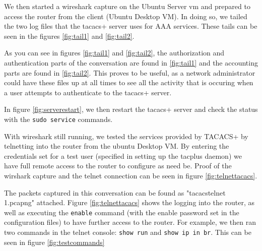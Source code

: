 \documentclass[main.tex]{subfiles}
\begin{document}

We then started a wireshark capture on the Ubuntu Server vm and prepared to access the router from the client (Ubuntu Desktop VM). In doing so, we tailed the two log files that the tacacs+ server uses for AAA services. These tails can be seen in the figures \ref{fig:tail1} and \ref{fig:tail2}.


As you can see in figures \ref{fig:tail1} and \ref{fig:tail2}, the authorization and authentication parts of the conversation are found in \ref{fig:tail1} and the accounting parts are found in \ref{fig:tail2}. This proves to be useful, as a network administrator could have these files up at all times to see all the activity that is occuring when a user attempts to authenticate to the tacacs+ server. 



In figure \ref{fig:serverestart}, we then restart the tacacs+ server and check the status with the \texttt{sudo service} commands.


With wireshark still running, we tested the services provided by TACACS+ by telnetting into the router from the ubuntu Desktop VM. By entering the credentials set for a test user (specified in setting up the tac\textunderscore plus daemon) we have full  remote access to the router to configure as need be. Proof of the wirshark capture and the telnet connection can be seen in figure \ref{fig:telnettacacs}.


The packets captured in this conversation can be found as "tacacs\textunderscore telnet \textunderscore 1.pcapng" attached. Figure \ref{fig:telnettacacs} shows the logging into the router, as well as executing the \texttt{enable} command (with the enable password set in the configuration files) to have further access to the router. For example, we then ran two commands in the telnet console: \texttt{show run} and \texttt{show ip in br}. This can be seen in figure \ref{fig:testcommands}


\end{document}
